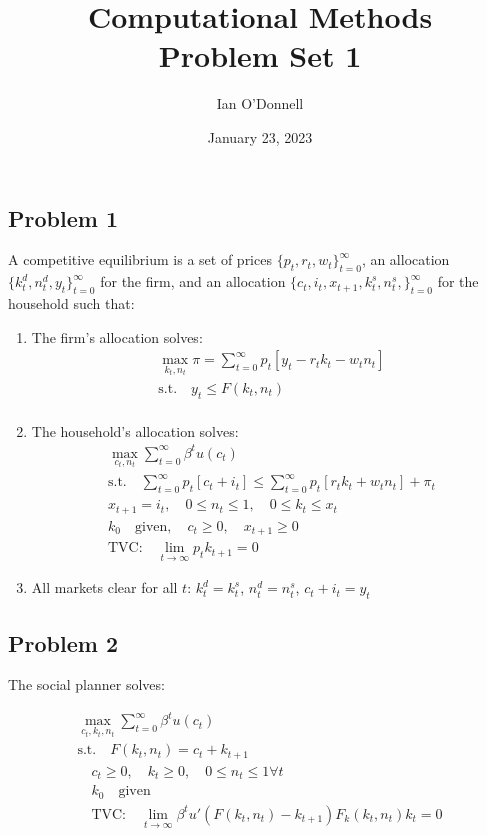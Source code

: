 \documentclass[12pt]{article}
\title{Computational Methods\\Problem Set 1}
\author{Ian O'Donnell}
\date{January 23, 2023}
\begin{document}
\maketitle

\subsection*{Problem 1}

A competitive equilibrium is a set of prices $ \{p_t , r_t, w_t\}_{t=0}^\infty $, an allocation $ \{k_t^d, n_t^d, y_t\}_{t=0}^\infty $
for the firm, and an allocation $ \{c_t, i_t, x_{t+1}, k_t^s, n_t^s,\}_{t=0}^\infty $ for the household such that: 
\begin{enumerate}
    \item The firm's allocation solves: 
    \begin{align*}
        \max_{k_t, n_t} \pi = \sum_{t=0}^{\infty} p_t [y_t - r_t k_t - w_t n_t] \\
        \text{s.t.} \quad y_t \leq F(k_t, n_t)\\
    \end{align*}

    \item The household's allocation solves: 
    \begin{gather*}
        \max_{c_t, n_t} \sum_{t=0}^{\infty} \beta^t u(c_t) \\
        \text{s.t.} \quad \sum_{t=0}^{\infty} p_t[c_t + i_t] \leq \sum_{t=0}^{\infty} p_t[r_t k_t + w_t n_t] + \pi _t \\
        x_{t+1} = i_t, \quad 0 \leq n_t \leq 1, \quad 0 \leq k_t \leq x_t \\
        k_0 \quad \text{given}, \quad c_t \geq 0, \quad x_{t+1} \geq 0 \\
        \text{TVC:} \quad \lim_{t \rightarrow \infty} p_t k_{t+1} = 0 
    \end{gather*}

    \item All markets clear for all $t$: $k_t^d = k_t^s$, $n_t^d = n_t^s$, $c_t + i_t = y_t$
\end{enumerate}

\subsection*{Problem 2}

The social planner solves: 

\begin{gather*}
    \max_{c_t, k_t, n_t} \sum_{t=0}^{\infty} \beta^t u(c_t) \\
    \text{s.t.} \quad F(k_t, n_t) = c_t + k_{t+1} \\
    \quad c_t \geq 0, \quad k_t \geq 0, \quad 0 \leq n_t \leq 1 \forall t \\
    \quad k_0 \quad \text{given} \\
    \quad \text{TVC:} \quad \lim_{t \rightarrow \infty} \beta^t u'(F(k_t, n_t) - k_{t+1})F_k(k_t, n_t)k_t = 0 
\end{gather*}
\end{document}

